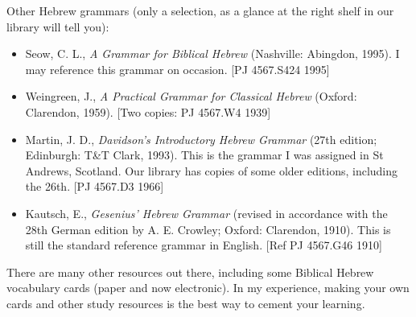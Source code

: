 \documentclass[12pt]{article}
\begin{document}
Other Hebrew grammars (only a selection, as a glance at the right shelf
in our library will tell you):

\begin{itemize}
\item
  Seow, C. L., \emph{A Grammar for Biblical Hebrew} (Nashville:
  Abingdon, 1995). I may reference this grammar on occasion. {[}PJ
  4567.S424 1995{]}
\item
  Weingreen, J., \emph{A Practical Grammar for Classical Hebrew}
  (Oxford: Clarendon, 1959). {[}Two copies: PJ 4567.W4 1939{]}
\item
  Martin, J. D., \emph{Davidson's Introductory Hebrew Grammar} (27th
  edition; Edinburgh: T\&T Clark, 1993). This is the grammar I was
  assigned in St Andrews, Scotland. Our library has copies of some older
  editions, including the 26th. {[}PJ 4567.D3 1966{]}
\item
  Kautsch, E., \emph{Gesenius' Hebrew Grammar} (revised in accordance
  with the 28th German edition by A. E. Crowley; Oxford: Clarendon,
  1910). This is still the standard reference grammar in English. {[}Ref
  PJ 4567.G46 1910{]}
\end{itemize}

There are many other resources out there, including some Biblical Hebrew
vocabulary cards (paper and now electronic). In my experience, making
your own cards and other study resources is the best way to cement your
learning.
\end{document}
